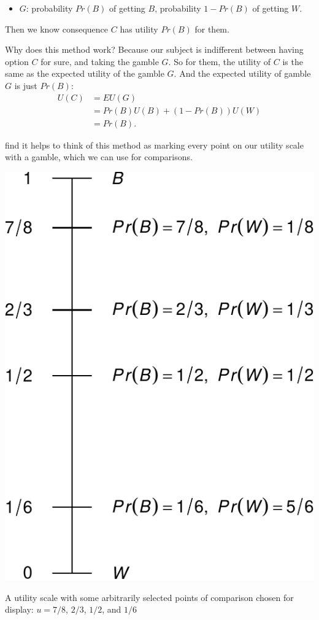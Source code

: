 \documentclass[justified]{tufte-book}
\providecommand{\tightlist}{%
  \setlength{\itemsep}{0pt}\setlength{\parskip}{0pt}}
\renewcommand{\u}{U}
\newcommand{\p}{Pr}
\newcommand{\EU}{EU}
\theoremstyle{definition}
\theoremstyle{definition}
\theoremstyle{definition}
\theoremstyle{remark}
\begin{document}
\begin{itemize}
\tightlist
\item
  \(G\): probability \(\p(B)\) of getting \(B\), probability \(1-\p(B)\)
  of getting \(W\).
\end{itemize}

Then we know consequence \(C\) has utility \(\p(B)\) for them.

Why does this method work? Because our subject is indifferent between
having option \(C\) for sure, and taking the gamble \(G\). So for them,
the utility of \(C\) is the same as the expected utility of the gamble
\(G\). And the expected utility of gamble \(G\) is just \(\p(B)\): \[
  \begin{aligned}
    \u(C) &= \EU(G)\\
          &= \p(B) \u(B) + (1-\p(B)) \u(W)\\
          &= \p(B).
  \end{aligned}
\]

 find it helps to think of this method as marking every
point on our utility scale with a gamble, which we can use for
comparisons.

\begin{marginfigure}
\includegraphics{_main_files/figure-latex/uscale-1} \caption[A utility scale with some arbitrarily selected points of comparison chosen for display]{A utility scale with some arbitrarily selected points of comparison chosen for display: $u = 7/8$, $2/3$, $1/2$, and $1/6$}\label{fig:uscale}
\end{marginfigure}
\end{document}

